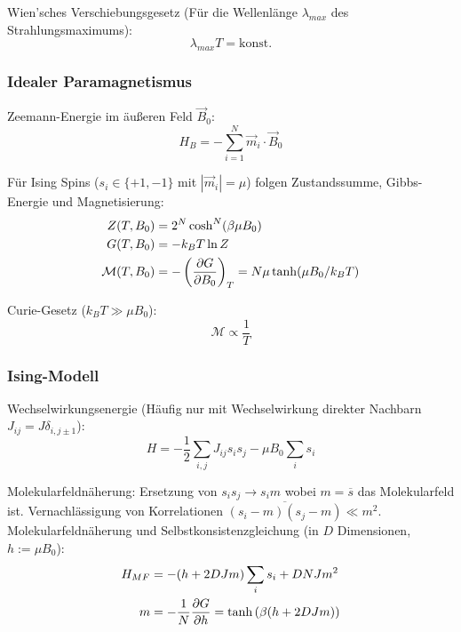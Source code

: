 \documentclass[11pt]{article}
\numberwithin{equation}{section}
\begin{document}
        Wien'sches Verschiebungsgesetz (Für die Wellenlänge $\lambda_{max}$ des Strahlungsmaximums):
        \begin{equation}
          \lambda_{max} T = \mathrm{konst}.
        \end{equation}

      \subsubsection{Idealer Paramagnetismus}
        Zeemann-Energie im äußeren Feld $\vec{B}_0$:
        \begin{equation}
          H_B = -\sum_{i=1}^N \vec{m}_i \cdot \vec{B}_0
        \end{equation}

        Für Ising Spins ($s_i\in\lbrace +1, -1\rbrace$ mit $|\vec{m}_i| = \mu$) folgen Zustandssumme, Gibbs-Energie und Magnetisierung:
        \begin{equation}
          \begin{aligned}
            Z(T,B_0) &= 2^N \cosh^N (\beta\mu B_0) \\
            G(T,B_0) &= -k_B T \ln Z \\
            \mathcal{M}(T,B_0) &= -\left(\frac{\partial G}{\partial B_0}\right)_T = N\mu \tanh(\mu B_0 /k_B T)
          \end{aligned}
        \end{equation}

        Curie-Gesetz ($k_B T \gg \mu B_0$):
        \begin{equation}
          \mathcal{M} \propto \frac{1}{T}
        \end{equation}

      \subsubsection{Ising-Modell}
        Wechselwirkungsenergie (Häufig nur mit Wechselwirkung direkter Nachbarn $J_{ij} = J \delta_{i,j\pm 1}$):
        \begin{equation}
          H = -\frac{1}{2}\sum_{i,j} J_{ij} s_i s_j -\mu B_0 \sum_i s_i
        \end{equation}

        Molekularfeldnäherung: Ersetzung von $s_i s_j \rightarrow s_i m$ wobei $m = \overline{s}$ das Molekularfeld ist. Vernachlässigung von Korrelationen $\overline{(s_i-m)(s_j-m)}\ll m^2$. \\
        Molekularfeldnäherung und Selbstkonsistenzgleichung (in $D$ Dimensionen, $h:=\mu B_0$):
        \begin{equation}
          \begin{aligned}
            H_{MF} &= -(h + 2 D J m) \sum_i s_i + D N J m^2 \\
            m &= -\frac{1}{N}\frac{\partial G}{\partial h} = \tanh\left({\beta(h + 2 D J m)}\right)
          \end{aligned}
        \end{equation}
\end{document}
